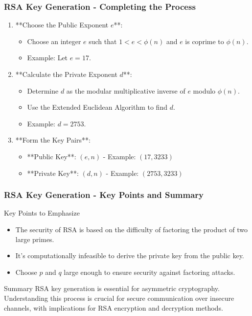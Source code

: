 \documentclass{beamer}
\begin{document}
\begin{frame}[fragile]
    \frametitle{RSA Key Generation - Completing the Process}
    \begin{enumerate}[resume]
        \item **Choose the Public Exponent \( e \)**:
        \begin{itemize}
            \item Choose an integer \( e \) such that \( 1 < e < \phi(n) \) and \( e \) is coprime to \( \phi(n) \). 
            \item Example: Let \( e = 17 \).
        \end{itemize}

        \item **Calculate the Private Exponent \( d \)**:
        \begin{itemize}
            \item Determine \( d \) as the modular multiplicative inverse of \( e \) modulo \( \phi(n) \).
            \item Use the Extended Euclidean Algorithm to find \( d \).
            \item Example: \( d = 2753 \).
        \end{itemize}

        \item **Form the Key Pairs**:
        \begin{itemize}
            \item **Public Key**: \( (e, n) \) - Example: \( (17, 3233) \)
            \item **Private Key**: \( (d, n) \) - Example: \( (2753, 3233) \)
        \end{itemize}
    \end{enumerate}
\end{frame}

\begin{frame}[fragile]
    \frametitle{RSA Key Generation - Key Points and Summary}
    \begin{block}{Key Points to Emphasize}
        \begin{itemize}
            \item The security of RSA is based on the difficulty of factoring the product of two large primes.
            \item It's computationally infeasible to derive the private key from the public key.
            \item Choose \( p \) and \( q \) large enough to ensure security against factoring attacks.
        \end{itemize}
    \end{block}

    \begin{block}{Summary}
        RSA key generation is essential for asymmetric cryptography. 
        Understanding this process is crucial for secure communication over insecure channels, with implications for 
        RSA encryption and decryption methods.
    \end{block}
\end{frame}
\end{document}
